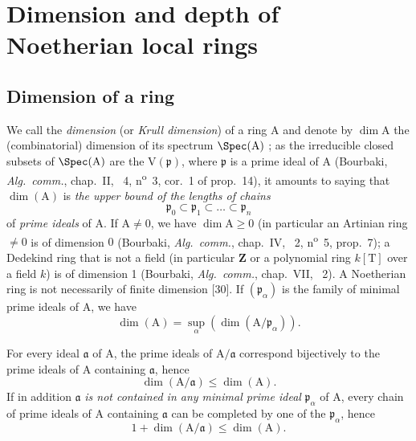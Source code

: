 \section{Dimension and depth of Noetherian local rings}
\label{section:0.16}

\subsection{Dimension of a ring}
\label{subsection:0.16.1}


\begin{env}[16.1.1]
\label{0.16.1.1}
We call the \emph{dimension} (or \emph{Krull dimension}) of a ring $\mathrm{A}$ and denote by $\dim\mathrm{A}$ the (combinatorial) dimension of its spectrum $\Spec(\mathrm{A})$ ; as the irreducible closed subsets of $\Spec(\mathrm{A})$ are the $\mathrm{V}(\mathfrak{p})$, where $\mathfrak{p}$ is a prime ideal of $\mathrm{A}$ (Bourbaki, \emph{Alg.~comm.}, chap.~II, \textsection~4, n\textsuperscript{o}~3, cor.~1 of prop.~14), it amounts to saying that $\dim(\mathrm{A})$ is \emph{the upper bound of the lengths of chains} 
\[
  \mathfrak{p}_0\subset\mathfrak{p}_1\subset\ldots\subset\mathfrak{p}_n
\]
of \emph{prime ideals} of $\mathrm{A}$.
If $\mathrm{A}\neq 0$, we have $\dim\mathrm{A}\geq 0$ (in particular an Artinian ring $\neq 0$ is of dimension $0$ (Bourbaki, \emph{Alg.~comm.}, chap.~IV, \textsection~2, n\textsuperscript{o}~5, prop.~7); a Dedekind ring that is not a field (in particular $\mathbf{Z}$ or a polynomial ring $k[\mathrm{T}]$ over a field $k$) is of dimension 1 (Bourbaki, \emph{Alg.~comm.}, chap.~VII, \textsection~2).
A Noetherian ring is not necessarily of finite dimension [30].
If $(\mathfrak{p}_\alpha)$ is the family of minimal prime ideals of $\mathrm{A}$, we have 
\begin{equation}
\label{0.16.1.1.1}
\tag{16.1.1.1}
  \dim(\mathrm{A})=\sup_\alpha(\dim(\mathrm{A}/\mathfrak{p}_\alpha)).
\end{equation}
\end{env}

\begin{env}[16.1.2]
\label{0.16.1.2}
For every ideal $\mathfrak{a}$ of $\mathrm{A}$, the prime ideals of $\mathrm{A}/\mathfrak{a}$ correspond bijectively to the prime ideals of $\mathrm{A}$ containing $\mathfrak{a}$, hence
\begin{equation}
\label{0.16.1.2.1}
\tag{16.1.2.1}
  \dim(\mathrm{A}/\mathfrak{a})\leq\dim(\mathrm{A}).
\end{equation}
If in addition $\mathfrak{a}$ \emph{is not contained in any minimal prime ideal} $\mathfrak{p}_\alpha$ of $\mathrm{A}$, every chain of prime ideals of $\mathrm{A}$ containing $\mathfrak{a}$ can be completed by one of the $\mathfrak{p}_\alpha$, hence
\begin{equation}
\label{0.16.1.2.2}
\tag{16.1.2.2}
  1+\dim(\mathrm{A}/\mathfrak{a})\leq\dim(\mathrm{A}).
\end{equation}
\end{env}

